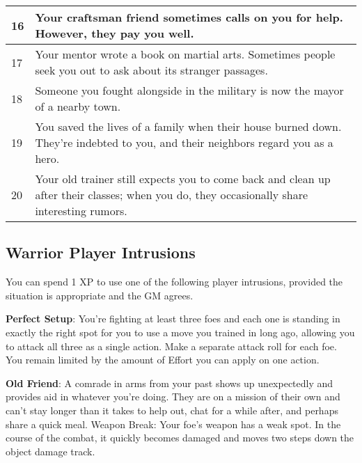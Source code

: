 \begin{table}
\begin{tabularx}{\textwidth}{| p{} | p{} |}
16 & Your craftsman friend sometimes calls on you for help. However, they pay you well. \\ \hline
17 & Your mentor wrote a book on martial arts. Sometimes people seek you out to ask about its stranger passages. \\ \hline
18 & Someone you fought alongside in the military is now the mayor of a nearby town. \\ \hline
19 & You saved the lives of a family when their house burned down. They’re indebted to you, and their neighbors regard you as a hero. \\ \hline
20 & Your old trainer still expects you to come back and clean up after their classes; when you do, they occasionally share interesting rumors. \\ \hline

\end{tabularx}

\end{table}

\begin{multicols}{2}

\subsection{Warrior Player Intrusions}

You can spend 1 XP to use one of the following player intrusions, provided the situation is appropriate and the GM agrees.

\textbf{Perfect Setup}: You’re fighting at least three foes and each one is standing in exactly the right spot for you to use a move you trained in long ago, allowing you to attack all three as a single action. Make a separate attack roll for each foe. You remain limited by the amount of Effort you can apply on one action.

\textbf{Old Friend}: A comrade in arms from your past shows up unexpectedly and provides aid in whatever you’re doing. They are on a mission of their own and can’t stay longer than it takes to help out, chat for a while after, and perhaps share a quick meal.
Weapon Break: Your foe’s weapon has a weak spot. In the course of the combat, it quickly becomes damaged and moves two steps down the object damage track.

\end{multicols}
